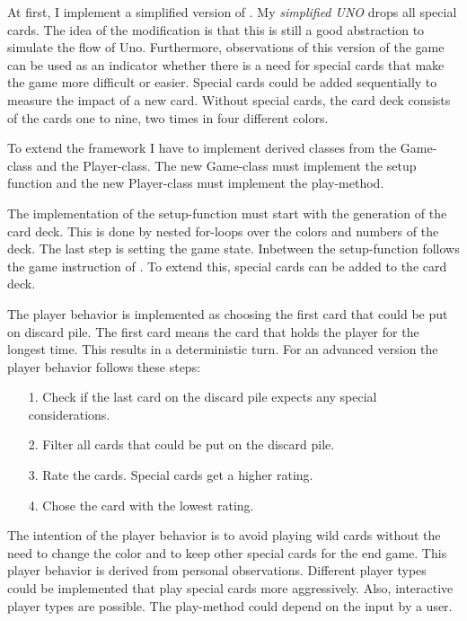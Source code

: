 At first, I implement a simplified version of \uno. My \textit{simplified UNO}  drops all special cards. The idea of the modification is that this is still a good abstraction to simulate the flow of Uno. Furthermore, observations of this version of the game can be used as an indicator whether there is a need for special cards that make the game more difficult or easier. Special cards could be added sequentially to measure the impact of a new card. Without special cards, the card deck consists of the cards one to nine, two times in four different colors.

To extend the framework I have to implement derived classes from the Game-class and the Player-class. The new Game-class must implement the setup function and the new Player-class must implement the play-method.

The implementation of the setup-function must start with the generation of the card deck. This is done by nested for-loops over the colors and numbers of the deck. The last step is setting the game state. Inbetween the setup-function follows the game instruction of \uno. To extend this, special cards can be added to the card deck.

The player behavior is implemented as choosing the first card that could be put on discard pile. The first card means the card that holds the player for the longest time. This results in a deterministic turn. For an advanced version the player behavior follows these steps:

\begin{itemize}
\item[1.] Check if the last card on the discard pile expects any special considerations.
\item[2.] Filter all cards that could be put on the discard pile.
\item[3.] Rate the cards. Special cards get a higher rating.
\item[4.] Chose the card with the lowest rating.
\end{itemize}

The intention of the player behavior is to avoid playing wild cards without the need to change the color and to keep other special cards for the end game. This player behavior is derived from personal observations. Different player types could be implemented that play special cards more aggressively. Also, interactive player types are possible. The play-method could depend on the input by a user.




